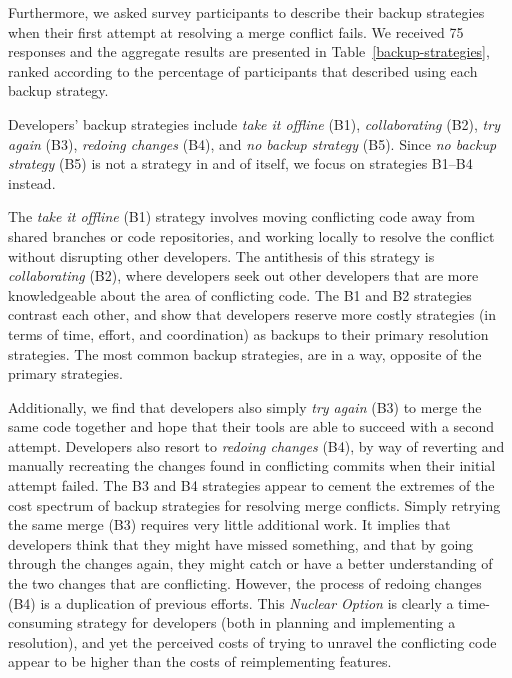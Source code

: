 
Furthermore, we asked survey participants to describe their backup strategies when their first attempt at resolving a merge conflict fails.
We received 75 responses and the aggregate results are presented in Table~\ref{backup-strategies}, ranked according to the percentage of participants that described using each backup strategy.

Developers' backup strategies include \textit{take it offline} (B1), \textit{collaborating} (B2), \textit{try again} (B3), \textit{redoing changes} (B4), and \textit{no backup strategy} (B5).
Since \textit{no backup strategy} (B5) is not a strategy in and of itself, we focus on strategies B1--B4 instead.

The \textit{take it offline} (B1) strategy involves moving conflicting code away from shared branches or code repositories, and working locally to resolve the conflict without disrupting other developers.
The antithesis of this strategy is \textit{collaborating} (B2), where developers seek out other developers that are more knowledgeable about the area of conflicting code.
The B1 and B2 strategies contrast each other, and show that developers reserve more costly strategies (in terms of time, effort, and coordination) as backups to their primary resolution strategies.
The most common backup strategies, are in a way, opposite of the primary strategies.

Additionally, we find that developers also simply \textit{try again} (B3) to merge the same code together and hope that their tools are able to succeed with a second attempt.
Developers also resort to \textit{redoing changes} (B4), by way of reverting and manually recreating the changes found in conflicting commits when their initial attempt failed.
The B3 and B4 strategies appear to cement the extremes of the cost spectrum of backup strategies for resolving merge conflicts.
Simply retrying the same merge (B3) requires very little additional work.
It implies that developers think that they might have missed something, and that by going through the changes again, they might catch or have a better understanding of the two changes that are conflicting.
However, the process of redoing changes (B4) is a duplication of previous efforts. %
This \textit{Nuclear Option} is clearly a time-consuming strategy for developers (both in planning and implementing a resolution), and yet the perceived costs of trying to unravel the conflicting code appear to be higher than the costs of reimplementing features.

